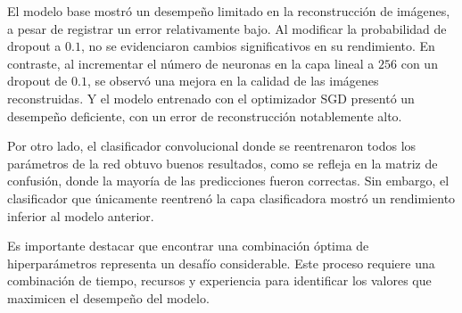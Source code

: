 \documentclass[aps,prl,reprint,groupedaddress]{revtex4-2}
\begin{document}
El modelo base mostró un desempeño limitado en la reconstrucción de imágenes, 
a pesar de registrar un error relativamente bajo. Al modificar la probabilidad 
de dropout a $0.1$, no se evidenciaron cambios significativos en su rendimiento. 
En contraste, al incrementar el número de neuronas en la capa lineal a $256$ 
con un dropout de $0.1$, se observó una mejora en la calidad de las imágenes 
reconstruidas. Y el modelo entrenado con el optimizador SGD presentó un desempeño 
deficiente, con un error de reconstrucción notablemente alto.

Por otro lado, el clasificador convolucional donde se reentrenaron todos los
parámetros de la red obtuvo buenos resultados, como se refleja en la matriz de 
confusión, donde la mayoría de las predicciones fueron correctas. Sin embargo, 
el clasificador que únicamente reentrenó la capa clasificadora mostró un 
rendimiento inferior al modelo anterior.

Es importante destacar que encontrar una combinación óptima de hiperparámetros 
representa un desafío considerable. Este proceso requiere una combinación de 
tiempo, recursos y experiencia para identificar los valores que maximicen el 
desempeño del modelo.




\end{document}

